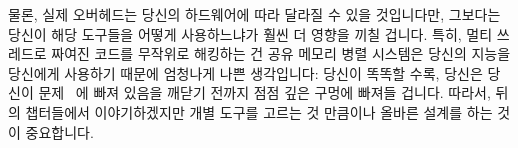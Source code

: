 물론, 실제 오버헤드는 당신의 하드웨어에 따라 달라질 수 있을 것입니다만,
그보다는 당신이 해당 도구들을 어떻게 사용하느냐가 훨씬 더 영향을 끼칠 겁니다.
특히, 멀티 쓰레드로 짜여진 코드를 무작위로 해킹하는 건 공유 메모리 병렬
시스템은 당신의 지능을 당신에게 사용하기 때문에 엄청나게 나쁜 생각입니다:
당신이 똑똑할 수록, 당신은 당신이 문제~\cite{DeadlockEmpire2016} 에 빠져 있음을
깨닫기 전까지 점점 깊은 구멍에 빠져들 겁니다.
따라서, 뒤의 챕터들에서 이야기하겠지만 개별 도구를 고르는 것 만큼이나 올바른
설계를 하는 것이 중요합니다.

